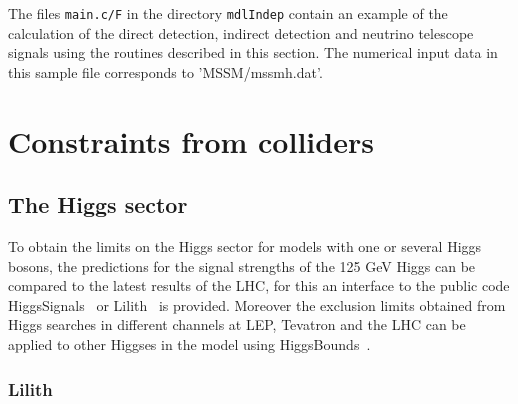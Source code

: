\documentclass[12pt,a4paper]{article}
\begin{document}
The files {\verb|main.c/F|} in the directory {\tt mdlIndep}  contain an example of the calculation of the direct detection,  indirect detection 
and neutrino telescope signals using the routines described in this section. 
The numerical input data in this sample file corresponds to 'MSSM/mssmh.dat'. 



\section{Constraints from colliders}

\subsection{The Higgs sector}
\label{sec:Higgs}
To obtain the  limits on the Higgs sector for models with one or several Higgs bosons, the predictions for the signal strengths of the 125 GeV Higgs  can be
compared  to the latest results of the LHC, for this an interface to the public code HiggsSignals~\cite{Bechtle:2013xfa} or Lilith~\cite{Bernon:2015hsa,Kraml:2019sis,Bertrand:2020lyb} is provided.
Moreover the exclusion limits obtained from Higgs searches in different channels at LEP, Tevatron and the LHC can be applied to other Higgses in the model using 
HiggsBounds~\cite{Bechtle:2013wla}. 


\subsubsection{Lilith}\label{sec:lilith}
\end{document}
